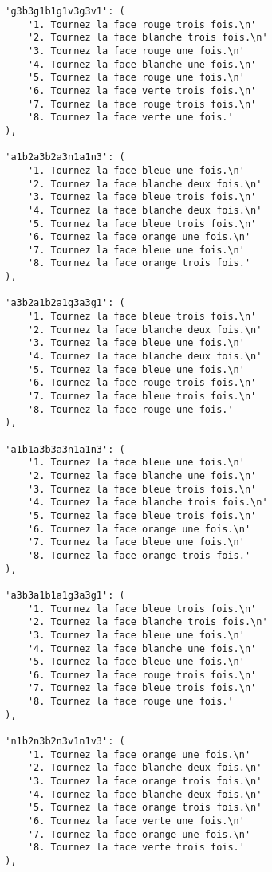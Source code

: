 \begin{lstlisting}
        'g3b3g1b1g1v3g3v1': (
            '1. Tournez la face rouge trois fois.\n'
            '2. Tournez la face blanche trois fois.\n'
            '3. Tournez la face rouge une fois.\n'
            '4. Tournez la face blanche une fois.\n'
            '5. Tournez la face rouge une fois.\n'
            '6. Tournez la face verte trois fois.\n'
            '7. Tournez la face rouge trois fois.\n'
            '8. Tournez la face verte une fois.'
        ),

        'a1b2a3b2a3n1a1n3': (
            '1. Tournez la face bleue une fois.\n'
            '2. Tournez la face blanche deux fois.\n'
            '3. Tournez la face bleue trois fois.\n'
            '4. Tournez la face blanche deux fois.\n'
            '5. Tournez la face bleue trois fois.\n'
            '6. Tournez la face orange une fois.\n'
            '7. Tournez la face bleue une fois.\n'
            '8. Tournez la face orange trois fois.'
        ),

        'a3b2a1b2a1g3a3g1': (
            '1. Tournez la face bleue trois fois.\n'
            '2. Tournez la face blanche deux fois.\n'
            '3. Tournez la face bleue une fois.\n'
            '4. Tournez la face blanche deux fois.\n'
            '5. Tournez la face bleue une fois.\n'
            '6. Tournez la face rouge trois fois.\n'
            '7. Tournez la face bleue trois fois.\n'
            '8. Tournez la face rouge une fois.'
        ),

        'a1b1a3b3a3n1a1n3': (
            '1. Tournez la face bleue une fois.\n'
            '2. Tournez la face blanche une fois.\n'
            '3. Tournez la face bleue trois fois.\n'
            '4. Tournez la face blanche trois fois.\n'
            '5. Tournez la face bleue trois fois.\n'
            '6. Tournez la face orange une fois.\n'
            '7. Tournez la face bleue une fois.\n'
            '8. Tournez la face orange trois fois.'
        ),

        'a3b3a1b1a1g3a3g1': (
            '1. Tournez la face bleue trois fois.\n'
            '2. Tournez la face blanche trois fois.\n'
            '3. Tournez la face bleue une fois.\n'
            '4. Tournez la face blanche une fois.\n'
            '5. Tournez la face bleue une fois.\n'
            '6. Tournez la face rouge trois fois.\n'
            '7. Tournez la face bleue trois fois.\n'
            '8. Tournez la face rouge une fois.'
        ),

        'n1b2n3b2n3v1n1v3': (
            '1. Tournez la face orange une fois.\n'
            '2. Tournez la face blanche deux fois.\n'
            '3. Tournez la face orange trois fois.\n'
            '4. Tournez la face blanche deux fois.\n'
            '5. Tournez la face orange trois fois.\n'
            '6. Tournez la face verte une fois.\n'
            '7. Tournez la face orange une fois.\n'
            '8. Tournez la face verte trois fois.'
        ),


\end{lstlisting}
